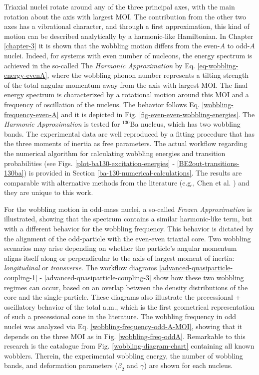 Triaxial nuclei rotate around any of the three principal axes, with the main rotation about the axis with largest MOI. The contribution from the other two axes has a vibrational character, and through a first approximation, this kind of motion can be described analytically by a harmonic-like Hamiltonian. In Chapter \ref{chapter-3} it is shown that the wobbling motion differs from the even-$A$ to odd-$A$ nuclei. Indeed, for systems with even number of nucleons, the energy spectrum is achieved in the so-called The \emph{Harmonic Approximation} by Eq. \eqref{eq-wobbling-energy-evenA}, where the wobbling phonon number represents a tilting strength of the total angular momentum away from the axis with largest MOI. The final energy spectrum is characterized by a rotational motion around this MOI and a frequency of oscillation of the nucleus. The behavior follows Eq. \eqref{wobbling-frequency-even-A} and it is depicted in Fig. \ref{fig-even-even-wobbling-energies}. The \emph{Harmonic Approximation} is tested for $^{130}$Ba nucleus, which has two wobbling bands. The experimental data are well reproduced by a fitting procedure that has the three moments of inertia as free parameters. The actual workflow regarding the numerical algorithm for calculating wobbling energies and transition probabilities (see Figs. \ref{plot-ba130-excitation-energies} - \ref{BE2out-transitions-130ba}) is provided in Section \ref{ba-130-numerical-calculations}. The results are comparable with alternative methods from the literature (e.g., Chen et al. \cite{chen2019transverse}) and they are unique to this work.

For the wobbling motion in odd-mass nuclei, a so-called \emph{Frozen Approximation} is illustrated, showing that the spectrum contains a similar harmonic-like term, but with a different behavior for the wobbling frequency. This behavior is dictated by the alignment of the odd-particle with the even-even triaxial core. Two wobbling scenarios may arise depending on whether the particle’s angular momentum aligns itself along or perpendicular to the axis of largest moment of inertia: \emph{longitudinal} or \emph{transverse}. The workflow diagrams \ref{advanced-quasiparticle-coupling-1} - \ref{advanced-quasiparticle-coupling-3} show how these two wobbling regimes can occur, based on an overlap between the density distributions of the core and the single-particle. These diagrams also illustrate the precessional + oscillatory behavior of the total a.m., which is the first geometrical representation of such a precessional cone in the literature. The wobbling frequency in odd nuclei was analyzed via Eq. \eqref{wobbling-frequency-odd-A-MOI}, showing that it depends on the three MOI as in Fig. \ref{wobbling-freq-oddA}. Remarkable to this research is the catalogue from Fig. \ref{wobbling-diagram-chart} containing all known wobblers. Therein, the experimental wobbling energy, the number of wobbling bands, and deformation parameters ($\beta_2$ and $\gamma$) are shown for each nucleus.

